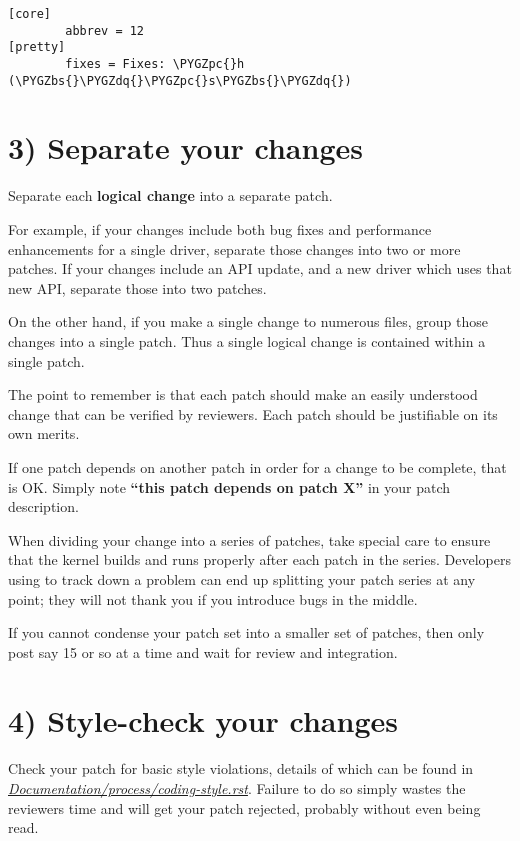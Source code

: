 \documentclass[a4paper,8pt,english]{sphinxmanual}
\def\PYGZbs{\char`\\}
\def\PYGZpc{\char`\%}
\def\PYGZdq{\char`\"}
\begin{document}
\begin{Verbatim}[commandchars=\\\{\}]
[core]
        abbrev = 12
[pretty]
        fixes = Fixes: \PYGZpc{}h (\PYGZbs{}\PYGZdq{}\PYGZpc{}s\PYGZbs{}\PYGZdq{})
\end{Verbatim}


\section{3) Separate your changes}
\label{process/submitting-patches:separate-your-changes}\label{process/submitting-patches:split-changes}
Separate each \textbf{logical change} into a separate patch.

For example, if your changes include both bug fixes and performance
enhancements for a single driver, separate those changes into two
or more patches.  If your changes include an API update, and a new
driver which uses that new API, separate those into two patches.

On the other hand, if you make a single change to numerous files,
group those changes into a single patch.  Thus a single logical change
is contained within a single patch.

The point to remember is that each patch should make an easily understood
change that can be verified by reviewers.  Each patch should be justifiable
on its own merits.

If one patch depends on another patch in order for a change to be
complete, that is OK.  Simply note \textbf{``this patch depends on patch X''}
in your patch description.

When dividing your change into a series of patches, take special care to
ensure that the kernel builds and runs properly after each patch in the
series.  Developers using  to track down a problem can end up
splitting your patch series at any point; they will not thank you if you
introduce bugs in the middle.

If you cannot condense your patch set into a smaller set of patches,
then only post say 15 or so at a time and wait for review and integration.


\section{4) Style-check your changes}
\label{process/submitting-patches:style-check-your-changes}
Check your patch for basic style violations, details of which can be
found in
{\hyperref[process/coding\string-style:codingstyle]{\emph{Documentation/process/coding-style.rst}}}.
Failure to do so simply wastes
the reviewers time and will get your patch rejected, probably
without even being read.
\end{document}
